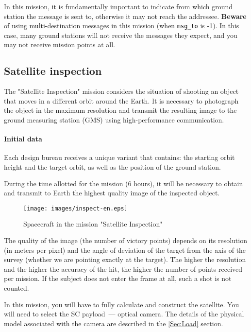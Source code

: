 \documentclass[12pt,a4paper]{article}
\begin{document}
In this mission, it is fundamentally important to indicate from which ground station the message is sent to, otherwise it may not reach the addressee. \textbf{Beware} of using multi-destination messages in this mission (when \verb'msg_to' is -1). In this case, many ground stations will not receive the messages they expect, and you may not receive mission points at all.

\subsection{Satellite inspection}

The "Satellite Inspection" mission considers the situation of shooting an object that moves in a different orbit around the Earth. It is necessary to photograph the object in the maximum resolution and transmit the resulting image to the ground measuring station (GMS) using high-performance communication.

\paragraph{Initial data}

Each design bureau receives a unique variant that contains: the starting orbit height and the target orbit, as well as the position of the ground station.

During the time allotted for the mission (6 hours), it will be necessary to obtain and transmit to Earth the highest quality image of the inspected object.

\begin{figure}[tbh]
  \begin{center}
    \texttt{[image: images/inspect-en.eps]}
    \caption{Spacecraft in the mission "Satellite Inspection"}
    \label{Pic:SMS}
  \end{center}
\end{figure}

The quality of the image (the number of victory points) depends on its resolution (in meters per pixel) and the angle of deviation of the target from the axis of the survey (whether we are pointing exactly at the target). The higher the resolution and the higher the accuracy of the hit, the higher the number of points received per mission. If the subject does not enter the frame at all, such a shot is not counted.

In this mission, you will have to fully calculate and construct the satellite. You will need to select the SC payload~--- optical camera. The details of the physical model associated with the camera are described in the \ref{Sec:Load} section.
\end{document}
